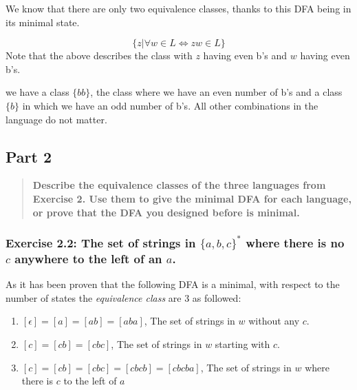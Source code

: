 \documentclass[titlepage]{article}\usepackage[]{graphicx}\usepackage[]{color}
\begin{document}
  We know that there are only two equivalence classes, thanks to this DFA being
  in its minimal state. 

  \[ \{ z | \forall w \in L \Leftrightarrow zw \in L \} \]
  Note that the above describes the class with $z$ having even b's and $w$
  having even b's. 

  we have a class $\{bb\}$, the class where we have an even number of b's and a
  class $\{b\}$ in which we have an odd number of b's. All other combinations
  in the language do not matter.


  \subsection*{Part 2}
\begin{quote}
  \textbf{Describe the equivalence classes of the three languages from Exercise
  2. Use them to give the minimal DFA for each language, or prove that the DFA
  you designed before is minimal.}
\end{quote}
\subsubsection{Exercise 2.2: The set of strings in $\{a, b, c\}^*$ where there is no $c$ anywhere to the left of an $a$.}
As it has been proven that the following DFA is a minimal, with respect to the number of states the \textit{equivalence class} are 3 as followed:


\begin{enumerate}
  \item $[\epsilon] = [a] = [ab] = [aba]$, The set of strings in $w$ without any $c$.
  \item $[c] = [cb] = [cbc]$, The set of strings in $w$ starting with $c$.
  \item $[c] = [cb] = [cbc] = [cbcb] = [cbcba]$, The set of strings in $w$ where there is $c$ to the left of $a$
\end{enumerate}
\end{document}
